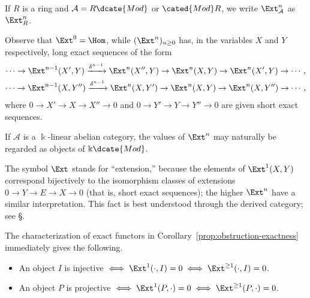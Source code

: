 If $R$ is a ring and $\mathcal{A}=R\dcate{Mod}$ or $\cated{Mod}R$, we write
$\Ext^n_{\mathcal{A}}$ as $\Ext^n_R$.

Observe that $\Ext^0=\Hom$, while $(\Ext^n)_{n\geq0}$ has, in the variables
$X$ and $Y$ respectively, long exact sequences of the form
\begin{gather*}
\cdots\to\Ext^{n-1}(X',Y)\xrightarrow{\delta^{n-1}}\Ext^n(X'',Y)\to
\Ext^n(X,Y)\to\Ext^n(X',Y)\to\cdots,\\
\cdots\to\Ext^{n-1}(X,Y'')\xrightarrow{\delta^{n-1}}\Ext^n(X,Y')\to
\Ext^n(X,Y)\to\Ext^n(X,Y'')\to\cdots,
\end{gather*}
where $0\to X'\to X\to X''\to0$ and
$0\to Y'\to Y\to Y''\to0$ are given short exact sequences.

If $\mathcal{A}$ is a $\Bbbk$-linear abelian category, the values of $\Ext^n$
may naturally be regarded as objects of $\Bbbk\dcate{Mod}$.

\begin{remark}
The symbol $\Ext$ stands for “extension,” because the elements of
$\Ext^1(X,Y)$ correspond bijectively to the isomorphism classes of extensions
$0\to Y\to E\to X\to0$ (that is, short exact sequences); the higher
$\Ext^n$ have a similar interpretation. This fact is best understood through
the derived category; see \S{}.
\end{remark}

The characterization of exact functors in
Corollary~\ref{prop:obstruction-exactness} immediately gives the following.

\begin{itemize}
\item An object $I$ is injective $\iff \Ext^1(\cdot,I)=0\iff
\Ext^{\geq1}(\cdot,I)=0$.
\item An object $P$ is projective $\iff \Ext^1(P,\cdot)=0\iff
\Ext^{\geq1}(P,\cdot)=0$.
\end{itemize}

